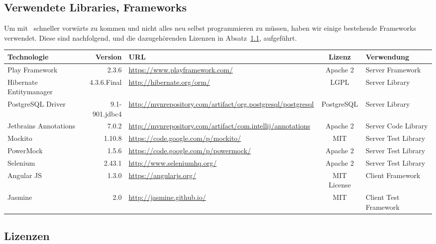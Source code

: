 \begin{landscape}
	\section{Verwendete Libraries, Frameworks}
	Um mit \eeppi\ schneller vorwärts zu kommen und nicht alles neu selbst programmieren zu müssen,
	haben wir einige bestehende Frameworks verwendet.
	Diese sind nachfolgend, und die dazugehörenden Lizenzen in Absatz\ \ref{subsec:licenses}, aufgeführt.
	
	
	\vspace{0.5cm}
	
	\newcommand{\addLib}[5]{
		#1 & #2 & \url{#3} & #4 & #5 \\ \hline
	}
	
	
	\begin{tabularx}{\linewidth}{| l r | X | c | l |}
		\hline
		\textbf{Technologie} & \textbf{Version} & \textbf{URL} & \textbf{Lizenz} & \textbf{Verwendung} \\
		\hline \hline
		\addLib{Play Framework}{2.3.6}{https://www.playframework.com/}{Apache 2}{Server Framework}
		\addLib{Hibernate Entitymanager}{4.3.6.Final}{http://hibernate.org/orm/}{LGPL}{Server Library}
		\addLib{PostgreSQL Driver}{9.1-901.jdbc4}{http://mvnrepository.com/artifact/org.postgresql/postgresql}{PostgreSQL}{Server Library}
		\addLib{Jetbrains Annotations}{7.0.2}{http://mvnrepository.com/artifact/com.intellij/annotations}{Apache 2}{Server Code Library}
		\addLib{Mockito}{1.10.8}{https://code.google.com/p/mockito/}{MIT}{Server Test Library}
		\addLib{PowerMock}{1.5.6}{https://code.google.com/p/powermock/}{Apache 2}{Server Test Library}
		\addLib{Selenium}{2.43.1}{http://www.seleniumhq.org/}{Apache 2}{Server Test Library}
		\addLib{Angular JS}{1.3.0}{https://angularjs.org/}{MIT License}{Client Framework}
		\addLib{Jasmine}{2.0}{http://jasmine.github.io/}{MIT}{Client Test Framework}
	\end{tabularx}
	
	\subsection{Lizenzen}
	\label{subsec:licenses}
	
	\newcommand{\addLicense}[6]{
		#1 & #2 & \url{#3} &
		\begin{itemize}[leftmargin=*,nosep]
			\setlength{\itemsep}{0pt}
    		\setlength{\parskip}{0pt}
	    	\setlength{\parsep}{0pt}
			#4
		\end{itemize}
		 &
		 \begin{itemize}[leftmargin=*,nosep]
			\setlength{\itemsep}{0pt}
    		\setlength{\parskip}{0pt}
	    	\setlength{\parsep}{0pt}
			#5
		\end{itemize}
		&
		\begin{itemize}[leftmargin=*,nosep]
			\setlength{\itemsep}{0pt}
    		\setlength{\parskip}{0pt}
	    	\setlength{\parsep}{0pt}
			#6
		\end{itemize}
		\\ \hline
	}


\end{landscape}
